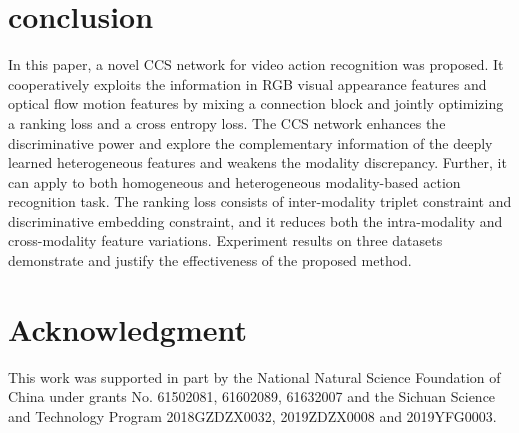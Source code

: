 \documentclass[conference,compsoc]{IEEEtran}
\begin{document}
\section{conclusion}
In this paper, a novel CCS network for video action recognition was proposed. It cooperatively exploits the information in RGB visual appearance features and optical flow motion features by mixing a connection block and jointly optimizing a ranking loss and a cross entropy loss. The CCS network enhances the discriminative power and explore the complementary information of the deeply learned heterogeneous features and weakens the modality discrepancy. Further, it can apply to both homogeneous and heterogeneous modality-based action recognition task. The ranking loss consists of inter-modality triplet constraint and discriminative embedding constraint, and it reduces both the intra-modality and cross-modality feature variations. Experiment results on three datasets demonstrate and justify the effectiveness of the proposed method.


\section*{Acknowledgment}
This work was supported in part by the National Natural Science Foundation of China under grants No. 61502081, 61602089, 61632007 and the Sichuan Science and Technology Program 2018GZDZX0032, 2019ZDZX0008 and 2019YFG0003.




\end{document}
